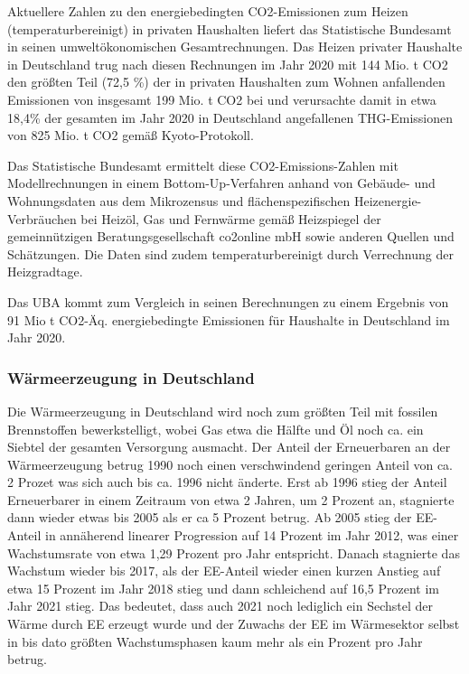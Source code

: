 				Aktuellere Zahlen zu den energiebedingten CO2-Emissionen zum Heizen (temperaturbereinigt) in privaten Haushalten liefert das Statistische Bundesamt in seinen umweltökonomischen Gesamtrechnungen. Das Heizen privater Haushalte in Deutschland trug nach diesen Rechnungen im Jahr 2020 mit 144 Mio. t CO2 den größten Teil (72,5 \%) der in privaten Haushalten zum Wohnen anfallenden Emissionen von insgesamt 199 Mio. t CO2 bei und verursachte damit in etwa 18,4\% der gesamten im Jahr 2020 in Deutschland angefallenen THG-Emissionen von 825 Mio. t CO2 gemäß Kyoto-Protokoll. \cite[S.~20]{destatis_2022_umweltoekonomische_gesamtrechnung_haushalte_umwelt} \cite[S.~16]{destatis_2022_umweltoekonomische_gesamtrechnung_anthropogene_luftemissionen}
				
				Das Statistische Bundesamt ermittelt diese CO2-Emissions-Zahlen mit Modellrechnungen in einem Bottom-Up-Verfahren anhand von Gebäude- und Wohnungsdaten aus dem Mikrozensus und flächenspezifischen Heizenergie-Verbräuchen bei Heizöl, Gas und Fernwärme gemäß Heizspiegel der gemeinnützigen Beratungsgesellschaft co2online mbH sowie anderen Quellen und Schätzungen. Die Daten sind zudem temperaturbereinigt durch Verrechnung der Heizgradtage. \cite{destatis_2020_umweltökonomische_gesamtrechnung_haushalte_umwelt_methodik}
				
				Das UBA kommt zum Vergleich in seinen Berechnungen zu einem Ergebnis von 91 Mio t CO2-Äq. energiebedingte Emissionen für Haushalte in Deutschland im Jahr 2020. \cite{uba_2022_energiebedingte_emissionen_brennstoffeinsätze_in_D_1990_2020}

			
			\subsubsection{Wärmeerzeugung in Deutschland}
				
				Die Wärmeerzeugung in Deutschland wird noch zum größten Teil mit fossilen Brennstoffen bewerkstelligt, wobei Gas etwa die Hälfte und Öl noch ca. ein Siebtel der gesamten Versorgung ausmacht. Der Anteil der Erneuerbaren an der Wärmeerzeugung betrug 1990 noch einen verschwindend geringen Anteil von ca. 2 Prozet was sich auch bis ca. 1996 nicht änderte. Erst ab 1996 stieg der Anteil Erneuerbarer in einem Zeitraum von etwa 2 Jahren, um 2 Prozent an, stagnierte dann wieder etwas bis 2005 als er ca 5 Prozent betrug. Ab 2005 stieg der EE-Anteil in annäherend linearer Progression auf 14 Prozent im Jahr 2012, was einer Wachstumsrate von etwa 1,29 Prozent pro Jahr entspricht. Danach stagnierte das Wachstum wieder bis 2017, als der EE-Anteil wieder einen kurzen Anstieg auf etwa 15 Prozent im Jahr 2018 stieg und dann schleichend auf 16,5 Prozent im Jahr 2021 stieg. Das bedeutet, dass auch 2021 noch lediglich ein Sechstel der Wärme durch EE erzeugt wurde und der Zuwachs der EE im Wärmesektor selbst in bis dato größten Wachstumsphasen kaum mehr als ein Prozent pro Jahr betrug. \cite{Umweltbundesamt_Energieverbrauch_Wärme} \cite{Umweltbundesamt_Abb_Entwicklung_Anteil_EE_Wärme_Kälte}

